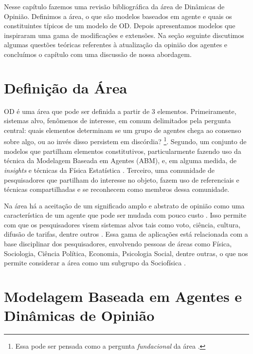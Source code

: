 Nesse capítulo fazemos uma revisão bibliográfica da área de Dinâmicas de
Opinião. Definimos a área, o que são modelos baseados em agente e quais os
constituintes típicos de um modelo de OD. Depois apresentamos modelos que
inspiraram uma gama de modificações e extensões. Na seção seguinte discutimos
algumas questões teóricas referentes à atualização da opinião dos agentes e
concluímos o capítulo com uma discussão de nossa abordagem.


\section{Definição da Área}

OD é uma área que pode ser definida a partir de 3 elementos. Primeiramente,
sistemas alvo, fenômenos de interesse, em comum delimitados pela pergunta
central: quais elementos determinam se um grupo de agentes chega ao consenso
sobre algo, ou ao invés disso persistem em discórdia?
\cite{castellano2012social}\footnote{Essa pode ser pensada como a pergunta
  \textit{fundacional} da área \cite{flache2017}.}. Segundo, um conjunto de
modelos que partilham elementos constitutivos, particularmente fazendo uso da
técnica da Modelagem Baseada em Agentes (ABM), e, em alguma medida, de
\textit{insights} e técnicas da Física Estatística \cite{galam1990social}.
Terceiro, uma comunidade de pesquisadores que partilham do interesse no objeto,
fazem uso de referenciais e técnicas compartilhadas e se reconhecem como membros
dessa comunidade.

Na área há a aceitação de um significado amplo e abstrato de opinião como uma
característica de um agente que pode ser mudada com pouco custo
\cite[p.312]{castellano2012social}. Isso permite com que os pesquisadores visem
sistemas alvos tais como voto, ciência, cultura, difusão de tarifas, dentre
outros
\cite{kowalska2013going,martins2015thou,axelrod1997dissemination,galam1990social}.
Essa gama de aplicações está relacionada com a base disciplinar dos
pesquisadores, envolvendo pessoas de áreas como Física, Sociologia, Ciência
Política, Economia, Psicologia Social, dentre outras, o que nos permite
considerar a área como um subgrupo da Sociofísica
\cite{galam1982sociophysics,galam2012sociophysics}.


\section{Modelagem Baseada em Agentes e Dinâmicas de Opinião}

